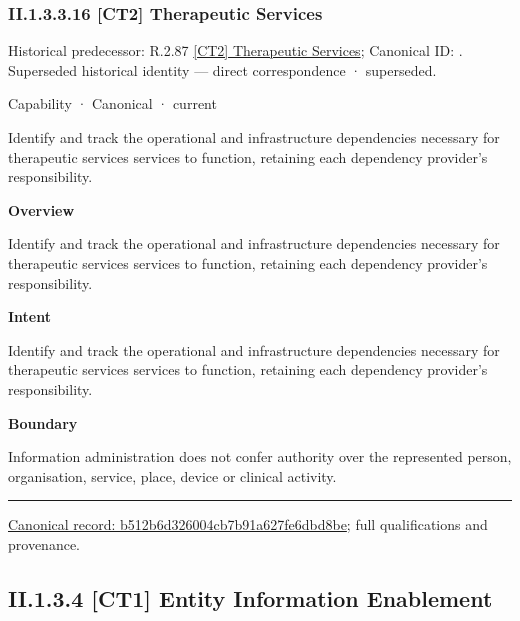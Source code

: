 \subsubsection*{II.1.3.3.16 [CT2] Therapeutic Services}
\label{navigation:II.1.3.3.16}

{\small Historical predecessor: R.2.87 \hyperref[element:54032b52ee444bfe8b611fb9e8e2ba10]{[CT2] Therapeutic Services}; Canonical ID: \texttt{}. Superseded historical identity — direct correspondence · superseded.}\par
\label{element:b512b6d326004cb7b91a627fe6dbd8be}
{\small Capability · Canonical · current}\par

Identify and track the operational and infrastructure dependencies necessary for therapeutic services services to function, retaining each dependency provider's responsibility.



\textbf{Overview}



Identify and track the operational and infrastructure dependencies necessary for therapeutic services services to function, retaining each dependency provider's responsibility.



\textbf{Intent}



Identify and track the operational and infrastructure dependencies necessary for therapeutic services services to function, retaining each dependency provider's responsibility.



\textbf{Boundary}



Information administration does not confer authority over the represented person, organisation, service, place, device or clinical activity.



\medskip\hrule\medskip

{\footnotesize \href{../../../../../../../continuum/strategy/capability/b512b6d326004cb7b91a627fe6dbd8be.md}{Canonical record: b512b6d326004cb7b91a627fe6dbd8be}; full qualifications and provenance.}\par
\subsection*{II.1.3.4 [CT1] Entity Information Enablement}
\label{navigation:II.1.3.4}

